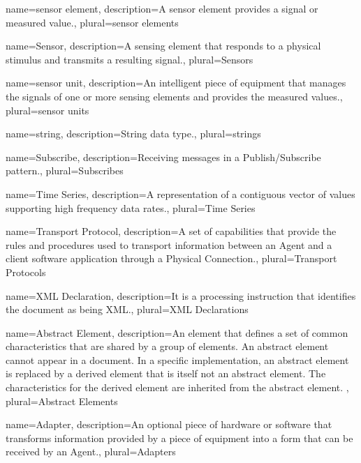 {
    name={sensor element},
	description={A \gls{sensor element} provides a signal or measured value.},
	plural={sensor elements}
}

{
    name={Sensor},
	description={A \gls{sensing element} that responds to a physical stimulus and transmits a resulting signal.},
	plural={Sensors}
}

{
    name={sensor unit},
	description={An intelligent piece of equipment that manages the signals of one or more \glspl{sensing element} and provides the measured values.},
	plural={sensor units}
}

{
    name={string},
	description={String data type.},
	plural={strings}
}

{
    name={Subscribe},
	description={Receiving messages in a \gls{Publish/Subscribe} pattern.},
	plural={Subscribes}
}

{
    name={Time Series},
	description={A  representation of a contiguous vector of values supporting high frequency data rates.},
	plural={Time Series}
}

{
    name={Transport Protocol},
	description={A set of capabilities that provide the rules and procedures used to transport information between an \gls{Agent} and a client software application through a \gls{Physical Connection}.},
	plural={Transport Protocols}
}

{
    name={XML Declaration},
	description={It is a processing instruction that identifies the document as being XML.},
	plural={XML Declarations}
}

{
    name={Abstract Element},
	description={An element that defines a set of common characteristics that are shared by a group of elements.
An abstract element cannot appear in a document. In a specific implementation, an abstract element is replaced by a derived element that is itself not an abstract element. The characteristics for the derived element are inherited from the abstract element. 
},
	plural={Abstract Elements}
}

{
    name={Adapter},
	description={An optional piece of hardware or software that transforms information provided by a piece of equipment into a form that can be received by an \gls{Agent}.},
	plural={Adapters}
}

